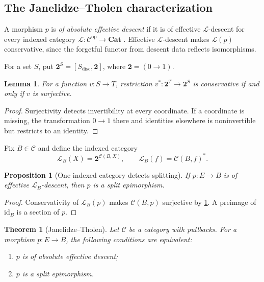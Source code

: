 \documentclass[11pt,a4paper]{article}
\numberwithin{equation}{section}
\newtheorem{theorem}{Theorem}[section]
\newtheorem{proposition}[proposition]{Proposition}
\newtheorem{lemma}[lemma]{Lemma}
\theoremstyle{definition}
\theoremstyle{remark}
\newcommand{\id}{\mathrm{id}}
\newcommand{\C}{\mathcal C}
\newcommand{\Lx}{\mathcal L}
\newcommand{\Cat}{\mathbf{Cat}}
\newcommand{\two}{\mathbf 2}
\begin{document}
\subsection{The Janelidze--Tholen characterization}

A morphism $p$ is \emph{of absolute effective descent} if it is of
effective $\Lx$-descent for every indexed category
$\Lx\colon\C^{\mathrm{op}}\to\Cat$
\cite{JanelidzeTholen1997}. Effective $\Lx$-descent makes $\Lx(p)$
conservative, since the forgetful functor from descent data reflects
isomorphisms.

For a set $S$, put $\two^S=[S_{\mathrm{disc}},\two]$, where
$\two=(0\to1)$.
\begin{lemma}
\label{lem:restriction-surjective}
For a function $v\colon S\to T$, restriction
$v^*\colon\two^T\to\two^S$ is conservative if and only if $v$ is
surjective.
\end{lemma}
\begin{proof}
Surjectivity detects invertibility at every coordinate. If a coordinate
is missing, the transformation $0\to1$ there and identities elsewhere
is noninvertible but restricts to an identity.
\end{proof}

Fix $B\in\C$ and define the indexed category
\begin{equation}
  \Lx_B(X)=\two^{\C(B,X)},\qquad
  \Lx_B(f)=\C(B,f)^*.
  \label{eq:detecting-indexed-category}
\end{equation}
\begin{proposition}[One indexed category detects splitting]
\label{prop:detects-splitting}
If $p\colon E\to B$ is of effective $\Lx_B$-descent, then $p$ is a
split epimorphism.
\end{proposition}
\begin{proof}
Conservativity of $\Lx_B(p)$ makes $\C(B,p)$ surjective by
\cref{lem:restriction-surjective}. A preimage of $\id_B$ is a section
of $p$.
\end{proof}

\begin{theorem}[Janelidze--Tholen]
\label{thm:JT}
Let $\C$ be a category with pullbacks. For a morphism
$p\colon E\to B$, the following conditions are equivalent:
\begin{enumerate}[label=\textup{(\roman*)},leftmargin=2.7em]
  \item $p$ is of absolute effective descent;
  \item $p$ is a split epimorphism.
\end{enumerate}
\end{theorem}
\end{document}
